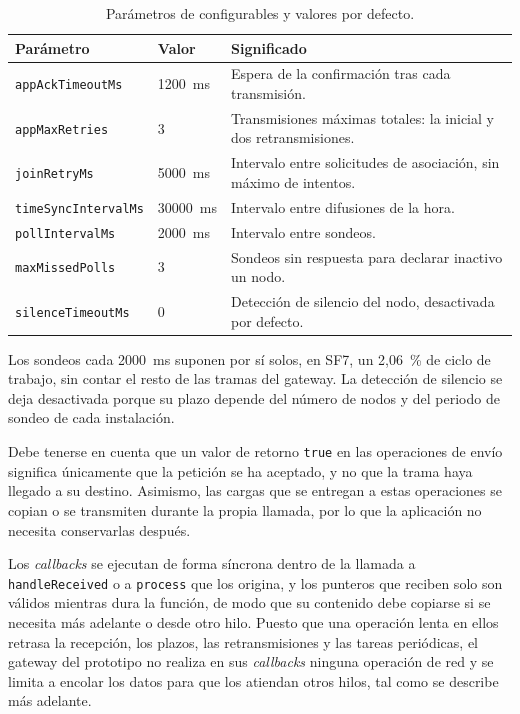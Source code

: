 \begin{table}[H]
\centering
\caption{\label{tab:temporizacion} Parámetros de configurables y valores por defecto.}
\begin{tabular}{|l|l|p{6.6cm}|}
\hline
\textbf{Parámetro} & \textbf{Valor} & \textbf{Significado} \\
\hline
\texttt{appAckTimeoutMs} & 1200~ms & Espera de la confirmación tras cada transmisión. \\
\hline
\texttt{appMaxRetries} & 3 & Transmisiones máximas totales: la inicial y dos retransmisiones. \\
\hline
\texttt{joinRetryMs} & 5000~ms & Intervalo entre solicitudes de asociación, sin máximo de intentos. \\
\hline
\texttt{timeSyncIntervalMs} & 30000~ms & Intervalo entre difusiones de la hora. \\
\hline
\texttt{pollIntervalMs} & 2000~ms & Intervalo entre sondeos. \\
\hline
\texttt{maxMissedPolls} & 3 & Sondeos sin respuesta para declarar inactivo un nodo. \\
\hline
\texttt{silenceTimeoutMs} & 0 & Detección de silencio del nodo, desactivada por defecto. \\
\hline
\end{tabular}
\end{table}

Los sondeos cada 2000~ms suponen por sí solos, en SF7, un 2,06~\% de ciclo de trabajo, sin contar el resto de las tramas del gateway. La detección de silencio se deja desactivada porque su plazo depende del número de nodos y del periodo de sondeo de cada instalación.

Debe tenerse en cuenta que un valor de retorno \texttt{true} en las operaciones de envío significa únicamente que la petición se ha aceptado, y no que la trama haya llegado a su destino. Asimismo, las cargas que se entregan a estas operaciones se copian o se transmiten durante la propia llamada, por lo que la aplicación no necesita conservarlas después.

Los \textit{callbacks} se ejecutan de forma síncrona dentro de la llamada a \texttt{handleReceived} o a \texttt{process} que los origina, y los punteros que reciben solo son válidos mientras dura la función, de modo que su contenido debe copiarse si se necesita más adelante o desde otro hilo. Puesto que una operación lenta en ellos retrasa la recepción, los plazos, las retransmisiones y las tareas periódicas, el gateway del prototipo no realiza en sus \textit{callbacks} ninguna operación de red y se limita a encolar los datos para que los atiendan otros hilos, tal como se describe más adelante.

